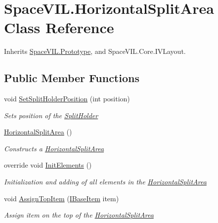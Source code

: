 \hypertarget{class_space_v_i_l_1_1_horizontal_split_area}{}\section{Space\+V\+I\+L.\+Horizontal\+Split\+Area Class Reference}
\label{class_space_v_i_l_1_1_horizontal_split_area}


Inherits \mbox{\hyperlink{class_space_v_i_l_1_1_prototype}{Space\+V\+I\+L.\+Prototype}}, and Space\+V\+I\+L.\+Core.\+I\+V\+Layout.

\subsection*{Public Member Functions}
\begin{DoxyCompactItemize}
\item 
void \mbox{\hyperlink{class_space_v_i_l_1_1_horizontal_split_area_a0e39ace0e53c5ec509c7b40168b025ae}{Set\+Split\+Holder\+Position}} (int position)
\begin{DoxyCompactList}\small\item\em Sets position of the \mbox{\hyperlink{class_space_v_i_l_1_1_split_holder}{Split\+Holder}} \end{DoxyCompactList}\item 
\mbox{\hyperlink{class_space_v_i_l_1_1_horizontal_split_area_ab2db170cc4803f8f92b1f54e40ccf33e}{Horizontal\+Split\+Area}} ()
\begin{DoxyCompactList}\small\item\em Constructs a \mbox{\hyperlink{class_space_v_i_l_1_1_horizontal_split_area}{Horizontal\+Split\+Area}} \end{DoxyCompactList}\item 
override void \mbox{\hyperlink{class_space_v_i_l_1_1_horizontal_split_area_ac977d45d7056f67bbd353877ff204df9}{Init\+Elements}} ()
\begin{DoxyCompactList}\small\item\em Initialization and adding of all elements in the \mbox{\hyperlink{class_space_v_i_l_1_1_horizontal_split_area}{Horizontal\+Split\+Area}} \end{DoxyCompactList}\item 
void \mbox{\hyperlink{class_space_v_i_l_1_1_horizontal_split_area_aecce1e6d987c61a20f1ae41513becefc}{Assign\+Top\+Item}} (\mbox{\hyperlink{interface_space_v_i_l_1_1_core_1_1_i_base_item}{I\+Base\+Item}} item)
\begin{DoxyCompactList}\small\item\em Assign item on the top of the \mbox{\hyperlink{class_space_v_i_l_1_1_horizontal_split_area}{Horizontal\+Split\+Area}} \end{DoxyCompactList}\item 

\end{DoxyCompactItemize}

